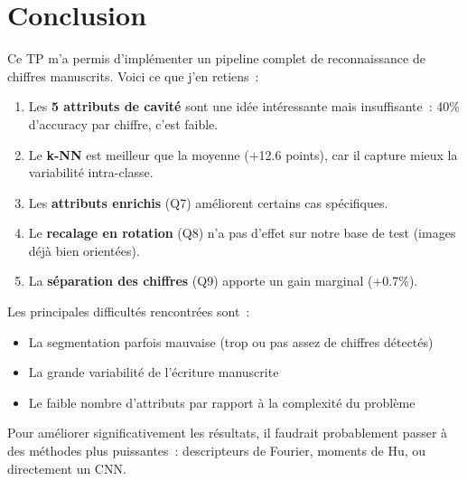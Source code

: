 \documentclass[a4paper,11pt]{article}
\begin{document}
\section{Conclusion}

Ce TP m'a permis d'implémenter un pipeline complet de reconnaissance de chiffres manuscrits. Voici ce que j'en retiens~:

\begin{enumerate}
    \item Les \textbf{5 attributs de cavité} sont une idée intéressante mais insuffisante~: 40\% d'accuracy par chiffre, c'est faible.
    \item Le \textbf{k-NN} est meilleur que la moyenne (+12.6 points), car il capture mieux la variabilité intra-classe.
    \item Les \textbf{attributs enrichis} (Q7) améliorent certains cas spécifiques.
    \item Le \textbf{recalage en rotation} (Q8) n'a pas d'effet sur notre base de test (images déjà bien orientées).
    \item La \textbf{séparation des chiffres} (Q9) apporte un gain marginal (+0.7\%).
\end{enumerate}

Les principales difficultés rencontrées sont~:
\begin{itemize}
    \item La segmentation parfois mauvaise (trop ou pas assez de chiffres détectés)
    \item La grande variabilité de l'écriture manuscrite
    \item Le faible nombre d'attributs par rapport à la complexité du problème
\end{itemize}

Pour améliorer significativement les résultats, il faudrait probablement passer à des méthodes plus puissantes~: descripteurs de Fourier, moments de Hu, ou directement un CNN.
\end{document}
